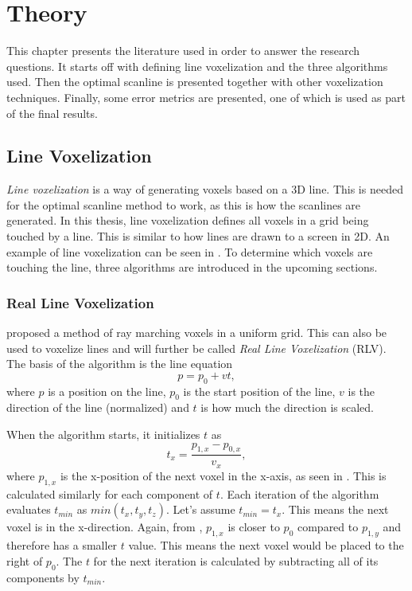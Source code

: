 \chapter{Theory}\label{cha:theory}
This chapter presents the literature used in order to answer the research questions.
It starts off with defining line voxelization and the three algorithms used.
Then the optimal scanline is presented together with other voxelization techniques.
Finally, some error metrics are presented, one of which is used as part of the final results.

\section{Line Voxelization}
\textit{Line voxelization} is a way of generating voxels based on a 3D line.
This is needed for the optimal scanline method to work, as this is how the scanlines are generated. 
In this thesis, line voxelization defines all voxels in a grid being touched by a line. 
This is similar to how lines are drawn to a screen in 2D.
An example of line voxelization can be seen in .
To determine which voxels are touching the line, three algorithms are introduced in the upcoming sections. 



\newpage

\subsection{Real Line Voxelization}
 proposed a method of ray marching voxels in a uniform grid. 
This can also be used to voxelize lines and will further be called \textit{Real Line Voxelization} (RLV).
The basis of the algorithm is the line equation
$$p = p_0 + vt,$$
where $p$ is a position on the line, $p_0$ is the start position of the line, $v$ is the direction of the line (normalized) and $t$ is how much the direction is scaled.

When the algorithm starts, it initializes $t$ as
$$t_x = \frac{p_{1,x} - p_{0,x}}{v_x},$$
where $p_{1,x}$ is the x-position of the next voxel in the x-axis, as seen in .
This is calculated similarly for each component of $t$.
Each iteration of the algorithm evaluates $t_{min}$ as $min(t_x,t_y,t_z)$.
Let's assume $t_{min} = t_x$.
This means the next voxel is in the x-direction.
Again, from , $p_{1,x}$ is closer to $p_0$ compared to $p_{1,y}$ and therefore has a smaller $t$ value.
This means the next voxel would be placed to the right of $p_0$.
The $t$ for the next iteration is calculated by subtracting all of its components by $t_{min}$.

